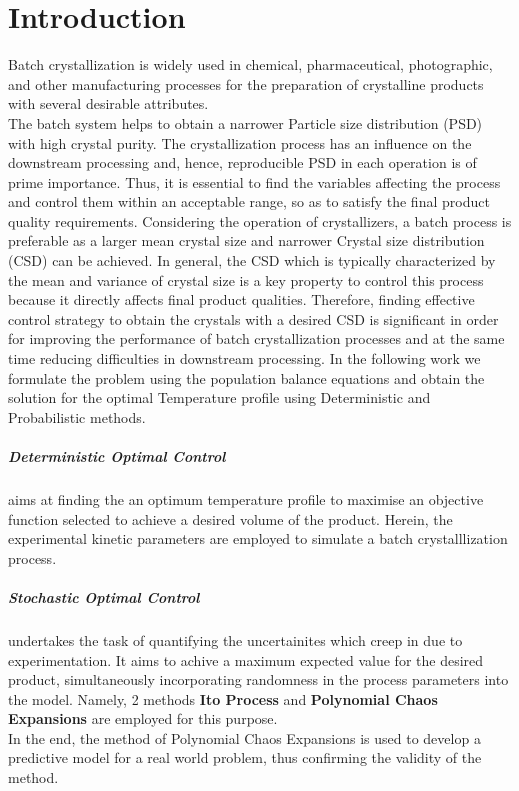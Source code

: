 \chapter{Introduction}
Batch crystallization is widely used in chemical, pharmaceutical, photographic, and other manufacturing processes for the preparation of crystalline products with several desirable attributes. \\
The batch system helps to obtain a narrower Particle size distribution (PSD) with high crystal purity. The crystallization process has an influence on the downstream processing and, hence, reproducible PSD in each operation is of prime importance. Thus, it is essential to find the variables affecting the process and control them within an acceptable range, so as to satisfy the final product quality requirements.
Considering the operation of crystallizers, a batch process is preferable as a larger mean crystal size and narrower Crystal size distribution (CSD) can be achieved. In general, the CSD which is typically characterized by the mean and variance of crystal size is a key property to control this process because it directly affects final product qualities. Therefore, finding effective control strategy to obtain the crystals with a desired CSD is significant in order for improving the performance of batch crystallization processes and at the same time reducing difficulties in downstream processing.
In the following work we formulate the problem using the population balance equations and obtain the solution for the optimal Temperature profile using Deterministic and Probabilistic methods. 

\paragraph{Deterministic Optimal Control} aims at finding the an optimum temperature profile to maximise an objective function selected to achieve a desired volume of the product. Herein, the experimental kinetic parameters are employed to simulate a batch crystalllization process.

\paragraph{Stochastic Optimal Control} undertakes the task of quantifying the uncertainites which creep in due to experimentation. It aims to achive a maximum expected value for the desired product, simultaneously incorporating  randomness in the process parameters into the model. Namely, 2 methods \textbf{Ito Process} and \textbf{Polynomial Chaos Expansions} are employed for this purpose.\\
In the end, the method of Polynomial Chaos Expansions is used to develop a predictive model for a real world problem, thus confirming the validity of the method.  

